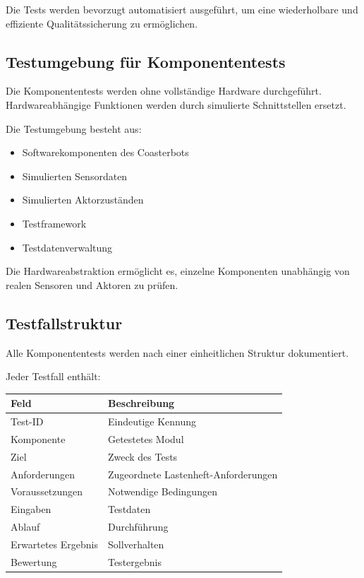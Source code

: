 \documentclass[
  a4paper,
  12pt,
  DIV=12,        %
  parskip=half,  %
  headings=small %
]{scrartcl}
\theoremstyle{definition}
\providecommand{\tightlist}{%
  \setlength{\itemsep}{0pt}\setlength{\parskip}{0pt}}
\theoremstyle{definition}
\begin{document}
Die Tests werden bevorzugt automatisiert ausgeführt, um eine
wiederholbare und effiziente Qualitätssicherung zu ermöglichen.

\subsection{Testumgebung für
Komponententests}\label{testumgebung-fuxfcr-komponententests}

Die Komponententests werden ohne vollständige Hardware durchgeführt.
Hardwareabhängige Funktionen werden durch simulierte Schnittstellen
ersetzt.

Die Testumgebung besteht aus:

\begin{itemize}
\tightlist
\item
  Softwarekomponenten des Coasterbots
\item
  Simulierten Sensordaten
\item
  Simulierten Aktorzuständen
\item
  Testframework
\item
  Testdatenverwaltung
\end{itemize}

Die Hardwareabstraktion ermöglicht es, einzelne Komponenten unabhängig
von realen Sensoren und Aktoren zu prüfen.

\subsection{Testfallstruktur}\label{testfallstruktur}

Alle Komponententests werden nach einer einheitlichen Struktur
dokumentiert.

Jeder Testfall enthält:

\begin{longtable}[]{@{}ll@{}}
\toprule\noalign{}
Feld & Beschreibung \\
\midrule\noalign{}
\endhead
\bottomrule\noalign{}
\endlastfoot
Test-ID & Eindeutige Kennung \\
Komponente & Getestetes Modul \\
Ziel & Zweck des Tests \\
Anforderungen & Zugeordnete Lastenheft-Anforderungen \\
Voraussetzungen & Notwendige Bedingungen \\
Eingaben & Testdaten \\
Ablauf & Durchführung \\
Erwartetes Ergebnis & Sollverhalten \\
Bewertung & Testergebnis \\
\end{longtable}
\end{document}
